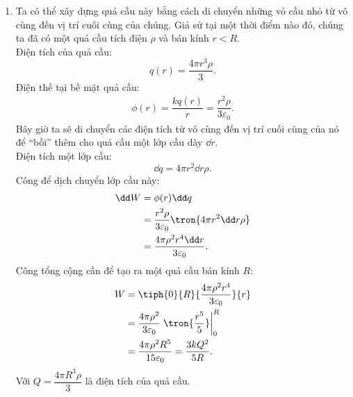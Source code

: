     \begin{loigiai}
    \begin{enumerate}[1)]
    \setlength{\itemsep}{0pt}
        \item Ta có thể xây dựng quả cầu này bằng cách di chuyển những vỏ cầu nhỏ từ vô cùng đến vị trí cuối cùng của chúng.  Giả sử tại một thời điểm nào đó, chúng ta đã có một quả cầu tích điện $\rho$ và bán kính $r<R$.\\
        Điện tích của quả cầu:
        $$q(r)=\dfrac{4\pi r^3\rho}{3}.$$
        Điện thế tại bề mặt quả cầu:
        \begin{equation*}
            \begin{aligned}
                \phi(r)=\dfrac{kq(r)}{r}
                =\dfrac{r^2\rho}{3\varepsilon_0}.
            \end{aligned}
        \end{equation*}
        Bây giờ ta sẽ di chuyển các điện tích từ vô cùng đến vị trí cuối cùng của nó để ``bồi'' thêm cho quả cầu một lớp cầu dày $\dd r$.\\
        Điện tích một lớp cầu:
        \begin{equation*}
            \dd q=4\pi r^2\dd r\rho.
        \end{equation*}
        Công để dịch chuyển lớp cầu này:
        \begin{equation*}
            \begin{aligned}
                \dd W&=\phi(r)\dd q\\
                &=\dfrac{r^2\rho}{3\varepsilon_0}\tron{4\pi r^2\dd r\rho}\\
               &=\dfrac{4\pi\rho^2 r^4 \dd r}{3\varepsilon_0}.
            \end{aligned}
        \end{equation*}
        Công tổng cộng cần để tạo ra một quả cầu bán kính $R$:
        \begin{equation*}
            \begin{aligned}
                W&=\tiph{0}{R}{\dfrac{4\pi\rho^2 r^4}{3\varepsilon_0}}{r}\\
                &=\dfrac{4\pi\rho^2}{3\varepsilon_0}\left.\tron{\dfrac{r^5}{5}}\right|_0^R\\
                &=\dfrac{4\pi\rho^2 R^5}{15\varepsilon_0}=\dfrac{3kQ^2}{5R}.\\
            \end{aligned}
        \end{equation*}
        Với $Q=\dfrac{4\pi R^3\rho}{3}$ là điện tích của quả cầu.

\end{enumerate}
\end{loigiai}
